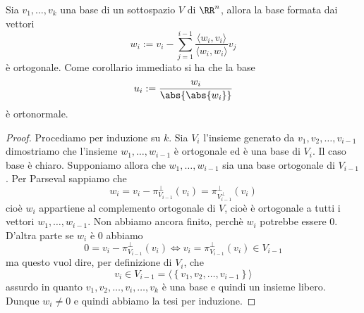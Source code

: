 \documentclass[11pt]{scrartcl}
\begin{document}
   	 \begin{theorem}
   	 	Sia $v_1,\dots, v_k$ una base di un sottospazio $V$ di $\RR^n$, allora la base formata dai vettori
   	 	$$w_i:=v_i-\sum_{j=1}^{i-1}\frac{\langle w_i,v_i \rangle}{\langle w_i,w_i\rangle }v_{j}$$
   	 	è ortogonale. Come corollario immediato si ha che la base
   	 	$$u_i:=\frac{w_i}{\abs{\abs{w_i}}}$$
   	 	è ortonormale.
   	 \end{theorem}
   	 \begin{proof}
   	 	Procediamo per induzione su $k$. Sia $V_i$ l'insieme generato da $v_1,v_2,\dots,v_{i-1}$ dimostriamo che l'insieme $w_1,\dots,w_{i-1}$ è ortogonale ed è una base di $V_i$. Il caso base è chiaro. Supponiamo allora che $w_1,\dots,w_{i-1}$ sia una base ortogonale di $V_{i-1}$. Per Parseval sappiamo che
   	 	$$w_i=v_{i}-\pi_{V_{i-1}}^\perp (v_i)=\pi_{V_{i-1}^\perp}^\perp (v_i)$$
   	 	cioè $w_i$ appartiene al complemento ortogonale di $V$, cioè è ortogonale a tutti i vettori $w_1,\dots,w_{i-1}$. Non abbiamo ancora finito, perchè $w_i$ potrebbe essere $0$. D'altra parte se $w_i$ è $0$ abbiamo
   	 	$$0=v_i-\pi_{V_{i-1}}^\perp(v_i) \iff v_i=\pi_{V_{i-1}}^\perp (v_i)\in V_{i-1}$$
   	 	ma questo vuol dire, per definizione di $V_i$, che 
   	 	$$v_i\in V_{i-1}=\langle\left\{v_1,v_2,\dots,v_{i-1}\right\}\rangle$$
   	 	assurdo in quanto $v_1,v_2,\dots,v_i,\dots,v_k$ è una base e quindi un insieme libero. Dunque $w_i\ne 0$ e quindi abbiamo la tesi per induzione. 
   	 \end{proof}
\end{document}
